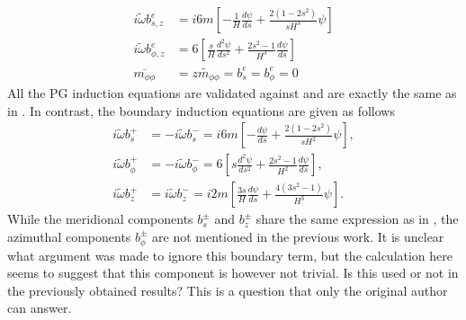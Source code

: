 \begin{equation}
\begin{aligned}
    i \widetilde{\omega} b_{s, z}^e &= i6m \left[- \frac{1}{H}\frac{d\psi}{d s} + \frac{2(1 - 2s^2)}{sH^3} \psi\right] \\
    i \widetilde{\omega} b_{\phi, z}^e &= 6\left[\frac{s}{H}\frac{d^{2}\psi}{d s^{2}} + \frac{2s^2 - 1}{H^3} \frac{d\psi}{d s} \right] \\
    \overline{m_{\phi\phi}} &= \widetilde{zm_{\phi\phi}} = b_{s}^e = b_{\phi}^e = 0
\end{aligned}
\end{equation}
All the PG induction equations are validated against and are exactly the same as in \textcite{holdenried-chernoff_long_2021}.
In contrast, the boundary induction equations are given as follows
\begin{equation}\label{eqn:eigen-bound-poloidal-dipole}
\begin{aligned}
    i \widetilde{\omega} b^{+}_{s} &= - i \widetilde{\omega} b^{-}_{s} = i 6m \left[-\frac{d\psi}{d s} + \frac{2(1 - 2s^2)}{sH^2} \psi\right], \\
    i \widetilde{\omega} b^{+}_{\phi} &= -i \widetilde{\omega} b^{-}_{\phi} = 6 \left[s \frac{d^{2}\psi}{d s^{2}} + \frac{2s^2 - 1}{H^2} \frac{d\psi}{d s} \right], \\ 
    i \widetilde{\omega} b^{+}_{z} &= i \widetilde{\omega} b^{-}_{z} = i2m \left[\frac{3 s}{H} \frac{d\psi}{d s} + \frac{4(3s^2 - 1)}{H^3} \psi \right].
\end{aligned}
\end{equation}
While the meridional components $b_s^{\pm}$ and $b_z^{\pm}$ share the same expression as in \textcite{holdenried-chernoff_long_2021}, the azimuthal components $b_\phi^{\pm}$ are not mentioned in the previous work.
It is unclear what argument was made to ignore this boundary term, but the calculation here seems to suggest that this component is however not trivial.
Is this used or not in the previously obtained results? This is a question that only the original author can answer.

